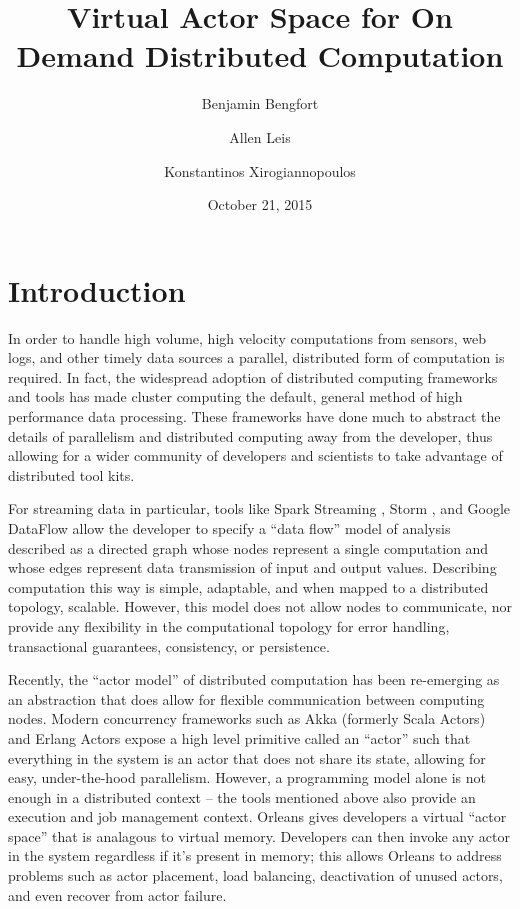 \documentclass[11pt,letterpaper]{article}
\begin{document}
\title{Virtual Actor Space for On Demand Distributed Computation}
\author[1]{Benjamin Bengfort}
\author[2]{Allen Leis}
\author[1]{Konstantinos Xirogiannopoulos}

\date{October 21, 2015}

\maketitle
\section*{Introduction}

In order to handle high volume, high velocity computations from sensors, web logs, and other timely data sources a parallel, distributed form of computation is required. In fact, the widespread adoption of distributed computing frameworks and tools has made cluster computing the default, general method of high performance data processing. These frameworks have done much to abstract the details of parallelism and distributed computing away from the developer, thus allowing for a wider community of developers and scientists to take advantage of distributed tool kits.

For streaming data in particular, tools like Spark Streaming \cite{zaharia2012discretized}, Storm \cite{toshniwal2014storm}, and Google DataFlow \cite{akidau2015dataflow} allow the developer to specify a ``data flow'' model of analysis described as a directed graph whose nodes represent a single computation and whose edges represent data transmission of input and output values. Describing computation this way is simple, adaptable, and when mapped to a distributed topology, scalable. However, this model does not allow nodes to communicate, nor provide any flexibility in the computational topology for error handling, transactional guarantees, consistency, or persistence.

Recently, the ``actor model'' \cite{hewitt1973universal} of distributed computation has been re-emerging as an abstraction that does allow for flexible communication between computing nodes. Modern concurrency frameworks such as Akka (formerly Scala Actors) \cite{karmani2009actor} and Erlang Actors \cite{vinoski2007concurrency} expose a high level primitive called an ``actor'' such that everything in the system is an actor that does not share its state, allowing for easy, under-the-hood parallelism. However, a programming model alone is not enough in a distributed context -- the tools mentioned above also provide an execution and job management context. Orleans \cite{bernstein_orleans_2015} gives developers a virtual ``actor space'' that is analagous to virtual memory. Developers can then invoke any actor in the system regardless if it's present in memory; this allows Orleans to address problems such as actor placement, load balancing, deactivation of unused actors, and even recover from actor failure.
\end{document}
